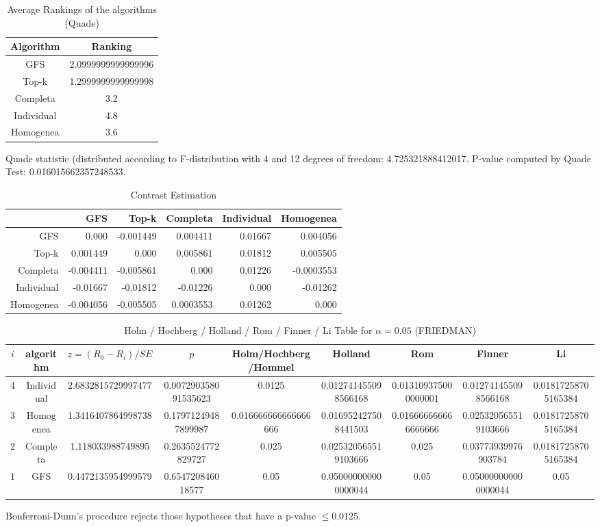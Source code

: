 \documentclass[a4paper,10pt]{article}
\begin{document}
\begin{landscape}
\newpage

\begin{table}[!htp]
\centering
\caption{Average Rankings of the algorithms (Quade)
}\begin{tabular}{c|c}
Algorithm&Ranking\\
\hline
GFS&2.0999999999999996\\
Top-k&1.2999999999999998\\
Completa&3.2\\
Individual&4.8\\
Homogenea&3.6\\
\end{tabular}
\end{table}
Quade statistic (distributed according to F-distribution with 4 and 12 degrees of freedom: 4.725321888412017. 
P-value computed by Quade Test: 0.016015662357248533.\newline


\newpage

\begin{table}[!htp]
\centering\tiny
\caption{Contrast Estimation}
\begin{tabular}{
|r|r|r|r|r|r|}
\hline
 &GFS&Top-k&Completa&Individual&Homogenea\\
\hline
GFS&0.000&-0.001449&0.004411&0.01667&0.004056\\
\hline
Top-k&0.001449&0.000&0.005861&0.01812&0.005505\\
\hline
Completa&-0.004411&-0.005861&0.000&0.01226&-0.0003553\\
\hline
Individual&-0.01667&-0.01812&-0.01226&0.000&-0.01262\\
\hline
Homogenea&-0.004056&-0.005505&0.0003553&0.01262&0.000\\
\hline

\end{tabular}
\end{table}

\newpage

\begin{table}[!htp]
\centering\scriptsize
\caption{Holm / Hochberg / Holland / Rom / Finner / Li Table for $\alpha=0.05$ (FRIEDMAN)}
\begin{tabular}{ccccccccc}
$i$&algorithm&$z=(R_0 - R_i)/SE$&$p$&Holm/Hochberg/Hommel&Holland&Rom&Finner&Li\\
\hline
4&Individual&2.6832815729997477&0.007290358091535623&0.0125&0.012741455098566168&0.013109375000000001&0.012741455098566168&0.01817258705165384\\
3&Homogenea&1.3416407864998738&0.17971249487899987&0.016666666666666666&0.016952427508441503&0.016666666666666666&0.025320565519103666&0.01817258705165384\\
2&Completa&1.118033988749895&0.2635524772829727&0.025&0.025320565519103666&0.025&0.03773939976903784&0.01817258705165384\\
1&GFS&0.4472135954999579&0.654720846018577&0.05&0.050000000000000044&0.05&0.050000000000000044&0.05\\
\hline
\end{tabular}
\end{table}
Bonferroni-Dunn's procedure rejects those hypotheses that have a p-value $\le0.0125$.



\end{landscape}
\end{document}
